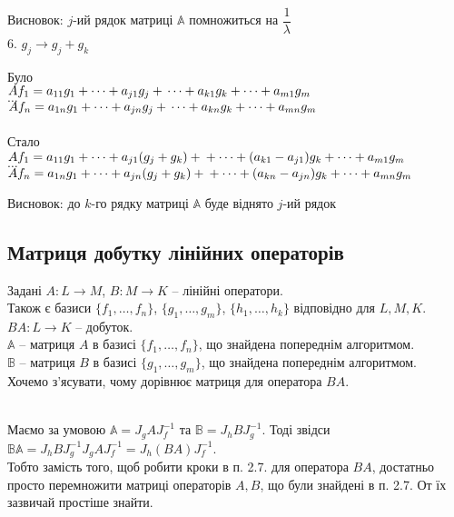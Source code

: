 \documentclass[a4paper, 10pt]{article}
\theoremstyle{theoremdd}
\begin{document}
	Висновок: $j$-ий рядок матриці $\mathbb{A}$ помножиться на $\dfrac{1}{\lambda}$
	\bigskip \\
	6. $g_j \rightarrow g_j + g_k$
	\multicolsep=0pt
	\begin{multicols}{2}
	Було \\
	$Af_1 = a_{11}g_1 + \dots + a_{j1}g_j + \\ \dots + a_{k1}g_k + \dots + a_{m1}g_m$\\
	$\dots$\\
	$Af_n = a_{1n}g_1 + \dots + a_{jn}g_j + \\ \dots + a_{kn}g_k + \dots + a_{mn}g_m$\\
	\columnbreak
	\\
	Стало \\
	$Af_1 = a_{11}g_1 + \dots + a_{j1}(g_j+g_k) + \\ + \dots + (a_{k1}-a_{j1})g_k + \dots + a_{m1}g_m$\\
	$\dots$\\
	$Af_n = a_{1n}g_1 + \dots + a_{jn}(g_j+g_k) + \\ + \dots + (a_{kn}-a_{jn})g_k + \dots + a_{mn}g_m$
	\end{multicols}
	Висновок: до $k$-го рядку матриці $\mathbb{A}$ буде віднято $j$-ий рядок
	\fi
	
	\subsection{Матриця добутку лінійних операторів}
	Задані $A \colon L \to M$, $B \colon M \to K$ -- лінійні оператори.\\
	Також є базиси $\{f_1,\dots, f_n\}$, $\{g_1,\dots, g_m\}$, $\{h_1,\dots, h_k\}$ відповідно для $L,M,K$.\\
	$BA \colon L \to K$ -- добуток.\\
	$\mathbb{A}$ -- матриця $A$ в базисі $\{f_1,\dots,f_n\}$, що знайдена попереднім алгоритмом.\\
	$\mathbb{B}$ -- матриця $B$ в базисі $\{g_1,\dots,g_m\}$, що знайдена попереднім алгоритмом.\\
	Хочемо з'ясувати, чому дорівнює матриця для оператора $BA$.\\
	\\
Маємо за умовою $\mathbb{A} = J_g A J_f^{-1}$ та $\mathbb{B} = J_h B J_g^{-1}$. Тоді звідси\\
$\mathbb{B} \mathbb{A} = J_h B J_g^{-1} J_g A J_f^{-1} = J_h (BA) J_f^{-1}$.\\
Тобто замість того, щоб робити кроки в п. 2.7. для оператора $BA$, достатньо просто перемножити матриці операторів $A,B$, що були знайдені в п. 2.7. От їх зазвичай простіше знайти.
\end{document}
